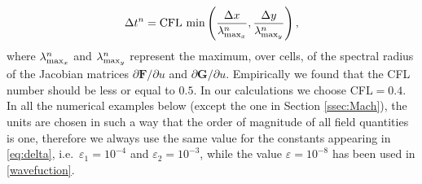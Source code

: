 $$
\Delta t^n = \mathrm{CFL}\, \min\left( \frac{\Delta x}{\lambda_{ {\rm max}_x}^n}, \frac{\Delta y}{\lambda_{ {\rm max}_y}^n}\right),   $$
where $\lambda_{{\rm max}_x}^n$ and $\lambda_{{\rm max}_y}^n$ represent the maximum, over cells, of the spectral radius of the Jacobian matrices $\partial \mathbf{F}/\partial u$ and $\partial \mathbf{G}/\partial u$. 
Empirically we found that the CFL number should be less or equal to $0.5$.
In our calculations we choose CFL$=0.4$.
In all the numerical examples below (except the one in Section \ref{ssec:Mach}), the units are chosen in such a way that the order of magnitude of all field quantities is one, therefore we always use the same value for the constants appearing in \eqref{eq:delta}, i.e.\ $\varepsilon_1=10^{-4}$ and $\varepsilon_2=10^{-3}$, while the value $\varepsilon = 10^{-8}$ has been used in \eqref{wavefuction}.


 

